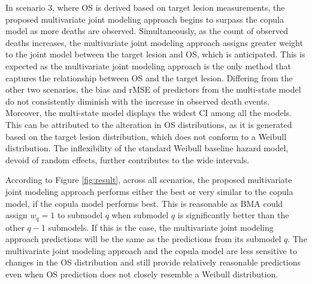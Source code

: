 \documentclass[aoas]{imsart}
\theoremstyle{plain}
\theoremstyle{remark}
\begin{document}
In scenario 3, where OS is derived based on target lesion measurements, the proposed multivariate joint modeling approach begins to surpass the copula model as more deaths are observed. Simultaneously, as the count of observed deaths increases, the multivariate joint modeling approach assigns greater weight to the joint model between the target lesion and OS, which is anticipated. This is expected as the multivariate joint modeling approach is the only method that captures the relationship between OS and the target lesion. Differing from the other two scenarios, the bias and rMSE of predictors from the multi-state model do not consistently diminish with the increase in observed death events. Moreover, the multi-state model displays the widest CI among all the models. This can be attributed to the alteration in OS distributions, as it is generated based on the target lesion distribution, which does not conform to a Weibull distribution. The inflexibility of the standard Weibull baseline hazard model, devoid of random effects, further contributes to the wide intervals.

According to Figure \ref{fig:result}, across all scenarios, the proposed multivariate joint modeling approach performs either the best or very similar to the copula model, if the copula model performs best. This is reasonable as BMA could assign $w_q = 1$ to submodel $q$ when submodel $q$ is significantly better than the other $q-1$ submodels. If this is the case, the multivariate joint modeling approach predictions will be the same as the predictions from its submodel $q$. The multivariate joint modeling approach and the copula model are less sensitive to changes in the OS distribution and still provide relatively reasonable predictions even when OS prediction does not closely resemble a Weibull distribution. 
\end{document}
